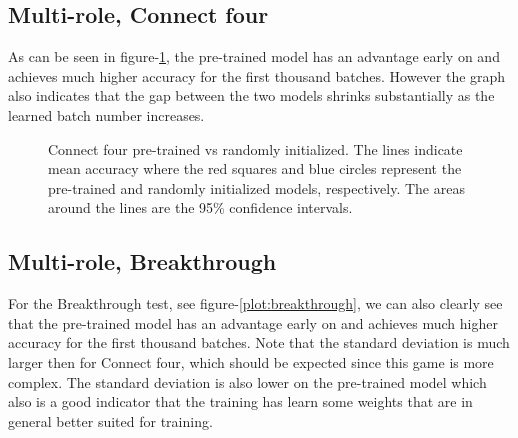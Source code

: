 \documentclass[twocolumn, letterpaper, 10 pt, conference]{ieeeconf}  %
\newcommand{\errorband}[5][]{ %
\pgfplotstableread[col sep=comma, skip first n=2]{#2}\datatable
    \addplot [draw=none, stack plots=y, forget plot] table [
        x={#3},
        y expr=\thisrow{#4}-2*\thisrow{#5}
    ] {\datatable};

    \addplot[draw=none, fill=gray!40, stack plots=y, area legend, #1] table [
        x={#3},
        y expr=4*\thisrow{#5}
    ] {\datatable} \closedcycle;

    \addplot [forget plot, stack plots=y,draw=none] table [x={#3}, y expr=-(\thisrow{#4}+2*\thisrow{#5})] {\datatable};
}
\begin{document}
\subsection{Multi-role, Connect four}
As can be seen in figure-\ref{fig:connect4}, the pre-trained model has an advantage early on and achieves much higher accuracy for the first thousand batches. However the graph also indicates that the gap between the two models shrinks substantially as the learned batch number increases.  

\begin{figure}[H]
    \caption{Connect four pre-trained vs randomly initialized. 
        The lines indicate mean accuracy where the red squares and blue circles represent the pre-trained and randomly initialized models, respectively. The areas around the lines are the 95\% confidence intervals.
    }
    \label{fig:connect4}
\end{figure}

\subsection{Multi-role, Breakthrough}
For the Breakthrough test, see figure-\ref{plot:breakthrough}, we can also clearly see that the pre-trained model has an advantage early on and achieves much higher accuracy for the first thousand batches. Note that the standard deviation is much larger then for Connect four, which should be expected since this game is more complex. The standard deviation is also lower on the pre-trained model which also is a good indicator that the training has learn some weights that are in general better suited for training. 
\end{document}
